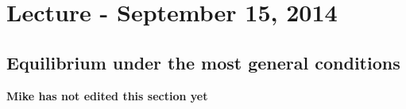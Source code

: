 \documentclass[12pt]{article}
\begin{document}
\section{Lecture - September 15, 2014}


\subsection{Equilibrium under the most general conditions}
\textbf{Mike has not edited this section yet}

\end{document}
